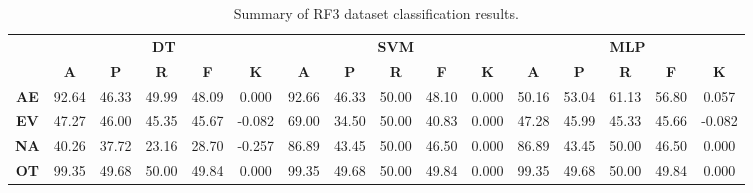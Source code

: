 \begin{landscape}
\begin{table}[htbp]
\footnotesize
\centering
\caption{Summary of RF3 dataset classification results.}
\label{tab:base_female}
\begin{tabular}{|c|c|c|c|c|c|c|c|c|c|c|c|c|c|c|c|}
\hline
\multirow{2}{*}{}	& \multicolumn{5}{c|}{\textbf{DT}}												& \multicolumn{5}{c|}{\textbf{SVM}}												& \multicolumn{5}{c|}{\textbf{MLP}}												\\ \cline{2-16} 
					& \textbf{A}	& \textbf{P}	& \textbf{R}	& \textbf{F}	& \textbf{K}	& \textbf{A}	& \textbf{P}	& \textbf{R}	& \textbf{F}	& \textbf{K}	& \textbf{A}	& \textbf{P}	& \textbf{R}	& \textbf{F}	& \textbf{K}	\\ \hline
\textbf{AE}			& 92.64			& 46.33			& 49.99			& 48.09			& 0.000			& 92.66			& 46.33			& 50.00			& 48.10			& 0.000			& 50.16			& 53.04			& 61.13			& 56.80			& 0.057			\\ \hline
\textbf{EV}			& 47.27			& 46.00			& 45.35			& 45.67			& -0.082			& 69.00			& 34.50			& 50.00			& 40.83			& 0.000			& 47.28			& 45.99			& 45.33			& 45.66			& -0.082			\\ \hline
\textbf{NA}			& 40.26			& 37.72			& 23.16			& 28.70			& -0.257			& 86.89			& 43.45			& 50.00			& 46.50			& 0.000			& 86.89			& 43.45			& 50.00			& 46.50			& 0.000			\\ \hline
\textbf{OT}			& 99.35			& 49.68			& 50.00			& 49.84			& 0.000			& 99.35			& 49.68			& 50.00			& 49.84			& 0.000			& 99.35			& 49.68			& 50.00			& 49.84			& 0.000			\\ \hline
\end{tabular}
\end{table}
\end{landscape}